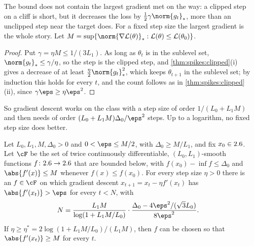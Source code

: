 \begin{refsection}
The bound does not contain the largest gradient met on the way: a clipped step on a cliff is short, but it decreases the loss by $\frac12\gamma\norm{g_t}_*$, more than an unclipped step near the target does. For a fixed step size the largest gradient is the whole story. Let $M=\sup\{\norm{\nabla\Loss(\theta)}_*:\Loss(\theta)\le\Loss(\theta_0)\}$.


\begin{proof}
Put $\gamma=\eta M\le1/(3L_1)$. As long as $\theta_t$ is in the sublevel set, $\norm{g_t}_*\le\gamma/\eta$, so the step is the clipped step, and \cref{thm:spikes:clipped}(i) gives a decrease of at least $\frac\eta2\norm{g_t}_*^2$, which keeps $\theta_{t+1}$ in the sublevel set; by induction this holds for every $t$, and the count follows as in \cref{thm:spikes:clipped}(ii), since $\gamma\eps\ge\eta\eps^2$.
\end{proof}

So gradient descent works on the class with a step size of order $1/(L_0+L_1M)$ and then needs of order $(L_0+L_1M)\Delta_0/\eps^2$ steps. Up to a logarithm, no fixed step size does better.

\begin{theorem}\label{thm:spikes:lower}
Let $L_0,L_1,M,\Delta_0>0$ and $0<\eps\le M/2$, with $\Delta_0\ge M/L_1$, and fix $x_0\in2.6$. Let $\cF$ be the set of twice continuously differentiable, $(L_0,L_1)$-smooth functions $f\colon2.6\to2.6$ that are bounded below, with $f(x_0)-\inf f\le\Delta_0$ and $\abs{f'(x)}\le M$ whenever $f(x)\le f(x_0)$. For every step size $\eta>0$ there is an $f\in\cF$ on which gradient descent $x_{t+1}=x_t-\eta f'(x_t)$ has $\abs{f'(x_t)}>\eps$ for every $t<N$, with
\begin{equation}\label{eq:spikes:lower}
  N=\frac{L_1M}{\log(1+L_1M/L_0)}\cdot\frac{\Delta_0-4\eps^2/(\sqrt3L_0)}{8\eps^2}.
\end{equation}
If $\eta\ge\eta^*=2\log(1+L_1M/L_0)/(L_1M)$, then $f$ can be chosen so that $\abs{f'(x_t)}\ge M$ for every $t$.
\end{theorem}


\end{refsection}

